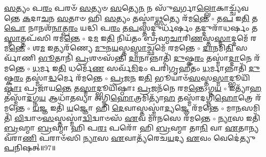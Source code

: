 \newcommand{\sep}{{\small$\circ$} }
\-\ul{𑌸}\-𑌤𑍍𑌯𑌂 𑌪\-\ul{𑌰𑌂} 𑌪𑌰𑍞᳴ \ul{𑌸}\-𑌤𑍍𑌯𑍞 \ul{𑌸}\-𑌤𑍍𑌯𑍇\-\ul{𑌨} 𑌨 𑌸𑍁᳴\-\ul{𑌵}\-𑌰𑍍𑌗𑌾\-\ul{𑌲𑍍𑌲𑍋}\-𑌕𑌾𑌚𑍍𑌚𑍍𑌯᳴𑌵𑌨𑍍𑌤𑍇 \ul{𑌕}\-𑌦𑌾\-\ul{𑌚}\-𑌨 \ul{𑌸}\-𑌤𑌾𑍞 𑌹𑌿 \ul{𑌸}\-𑌤𑍍𑌯𑌂 𑌤𑌸𑍍𑌮𑌾॑\-\ul{𑌥𑍍𑌸}\-𑌤𑍍𑌯𑍇 𑌰᳴𑌮\-\ul{𑌨𑍍𑌤𑍇} \sep
𑌤\-\ul{𑌪} 𑌇\-\ul{𑌤𑌿} 𑌤\-\ul{𑌪𑍋} 𑌨𑌾𑌨𑌶᳴\-\ul{𑌨𑌾}\-𑌤𑍍𑌪\-\ul{𑌰𑌂} 𑌯𑌦𑍍𑌧𑌿 𑌪\-\ul{𑌰𑌂} 𑌤\-\ul{𑌪}\-𑌸𑍍𑌤𑌦𑍍𑌦𑍁𑌰𑍍𑌧᳴𑌰𑍍\mbox{}\-\ul{𑌷𑌂} 𑌤𑌦𑍍𑌦𑍁𑌰𑌾᳴𑌧𑌰𑍍\mbox{}\-\ul{𑌷𑌂} 𑌤\-\ul{𑌸𑍍𑌮𑌾}\-𑌤𑍍𑌤𑌪᳴𑌸𑌿 𑌰𑌮\-\ul{𑌨𑍍𑌤𑍇} \sep
𑌦\-\ul{𑌮} 𑌇\-\ul{𑌤𑌿} 𑌨𑌿𑌯᳴𑌤𑌂 𑌬𑍍𑌰𑌹𑍍𑌮\-\ul{𑌚𑌾}\-𑌰𑌿\-\ul{𑌣}\-𑌸𑍍𑌤\-\ul{𑌸𑍍𑌮𑌾}\-𑌦𑍍𑌦𑌮𑍇᳴ 𑌰𑌮\-\ul{𑌨𑍍𑌤𑍇} \sep
𑌶\-\ul{𑌮} 𑌇𑌤𑍍𑌯𑌰᳴𑌣𑍍𑌯𑍇 \ul{𑌮𑍁}\-𑌨\-\ul{𑌯}\-𑌸𑍍𑌤\-\ul{𑌸𑍍𑌮𑌾}\-𑌚𑍍𑌛𑌮𑍇᳴ 𑌰𑌮𑌨𑍍𑌤𑍇 \sep
\-\ul{𑌦𑌾}\-𑌨𑌮𑌿\-\ul{𑌤𑌿} 𑌸𑌰𑍍𑌵𑌾᳴𑌣𑌿 \ul{𑌭𑍂}\-𑌤𑌾𑌨𑌿᳴ \ul{𑌪𑍍𑌰}\-𑌶𑍞𑌸᳴𑌨𑍍𑌤𑌿 \ul{𑌦𑌾}\-𑌨𑌾𑌨𑍍𑌨𑌾𑌤𑌿᳴ \ul{𑌦𑍁}\-𑌷𑍍𑌕\-\ul{𑌰𑌂} 𑌤𑌸𑍍𑌮𑌾॑\-\ul{𑌦𑍍𑌦𑌾}\-𑌨𑍇 𑌰᳴𑌮𑌨𑍍𑌤𑍇 \sep
\-\ul{𑌧}\-𑌰𑍍𑌮 𑌇\-\ul{𑌤𑌿} 𑌧𑌰𑍍𑌮𑍇᳴\-\ul{𑌣} 𑌸𑌰𑍍𑌵᳴\-\ul{𑌮𑌿}\-𑌦𑌂 𑌪𑌰𑌿᳴𑌗𑍃𑌹𑍀𑌤𑌂 \ul{𑌧}\-𑌰𑍍𑌮𑌾𑌨𑍍𑌨𑌾𑌤𑌿᳴ \ul{𑌦𑍁}\-𑌷𑍍𑌕\-\ul{𑌰𑌂} 𑌤𑌸𑍍𑌮𑌾॑\-\ul{𑌦𑍍𑌧}\-𑌰𑍍𑌮𑍇 𑌰᳴𑌮𑌨𑍍𑌤𑍇 \sep
\-\ul{𑌪𑍍𑌰}\-𑌜\-\ul{𑌨} 𑌇\-\ul{𑌤𑌿} 𑌭𑍂𑌯𑌾𑍞᳴\-\ul{𑌸}\-𑌸𑍍𑌤\-\ul{𑌸𑍍𑌮𑌾}\-𑌦𑍍𑌭𑍂𑌯𑌿᳴\-\ul{𑌷𑍍𑌠𑌾𑌃} 𑌪𑍍𑌰𑌜𑌾᳴𑌯\-\ul{𑌨𑍍𑌤𑍇} 𑌤\-\ul{𑌸𑍍𑌮𑌾}\-𑌦𑍍𑌭𑍂𑌯𑌿᳴𑌷𑍍𑌠𑌾𑌃 \ul{𑌪𑍍𑌰}\-𑌜𑌨᳴𑌨𑍇 𑌰𑌮\-\ul{𑌨𑍍𑌤𑍇}\-𑌽𑌗𑍍𑌨\-\ul{𑌯} \sep
𑌇𑌤𑍍𑌯𑌾᳴\-\ul{𑌹} 𑌤𑌸𑍍𑌮𑌾᳴\-\ul{𑌦}\-𑌗𑍍𑌨\-\ul{𑌯} 𑌆𑌧𑌾᳴𑌤𑌵𑍍𑌯𑌾 𑌅𑌗𑍍𑌨𑌿\-\ul{𑌹𑍋}\-𑌤𑍍𑌰𑌮𑌿𑌤𑍍𑌯𑌾᳴\-\ul{𑌹} 𑌤𑌸𑍍𑌮𑌾᳴𑌦𑌗𑍍𑌨𑌿\-\ul{𑌹𑍋}\-𑌤𑍍𑌰𑍇 𑌰᳴𑌮𑌨𑍍𑌤𑍇 \sep
\-\ul{𑌯}\-𑌜𑍍𑌞 𑌇𑌤𑌿᳴ \ul{𑌯}\-𑌜𑍍𑌞𑍋 𑌹𑌿 \ul{𑌦𑍇}\-𑌵𑌾𑌸𑍍𑌤𑌸𑍍𑌮𑌾॑\-\ul{𑌦𑍍𑌯}\-𑌜𑍍𑌞𑍇 𑌰᳴𑌮𑌨𑍍𑌤𑍇 \sep
𑌮𑌾\-\ul{𑌨}\-𑌸𑌮𑌿𑌤𑌿᳴ \ul{𑌵𑌿}\-𑌦𑍍𑌵𑌾𑍞\-\ul{𑌸}\-𑌸𑍍𑌤𑌸𑍍𑌮𑌾॑\-\ul{𑌦𑍍𑌵𑌿}\-𑌦𑍍𑌵𑌾𑍞𑌸᳴ \ul{𑌏}\-𑌵 𑌮𑌾᳴\-\ul{𑌨}\-𑌸𑍇 𑌰᳴𑌮𑌨𑍍𑌤𑍇 \sep
\-\ul{𑌨𑍍𑌯𑌾}\-𑌸 𑌇𑌤𑌿᳴ \ul{𑌬𑍍𑌰}\-𑌹𑍍𑌮𑌾 \ul{𑌬𑍍𑌰}\-𑌹𑍍𑌮𑌾 𑌹𑌿 𑌪\-\ul{𑌰𑌃} 𑌪𑌰𑍋᳴ 𑌹𑌿 \ul{𑌬𑍍𑌰}\-𑌹𑍍𑌮𑌾 𑌤𑌾\-\ul{𑌨𑌿} 𑌵𑌾 \ul{𑌏}\-𑌤𑌾𑌨𑍍𑌯𑌵᳴𑌰𑌾\-\ul{𑌣𑌿} 𑌪𑌰𑌾𑍞᳴𑌸𑌿 \ul{𑌨𑍍𑌯𑌾}\-𑌸 \ul{𑌏}\-𑌵𑌾𑌤𑍍𑌯᳴𑌰𑍇𑌚\-\ul{𑌯}\-𑌦𑍍𑌯 \ul{𑌏}\-𑌵𑌂 𑌵𑍇𑌦𑍇॑𑌤𑍍𑌯𑍁\-\ul{𑌪}\-𑌨𑌿𑌷𑌤𑍍॥97॥
\anuvakamend


